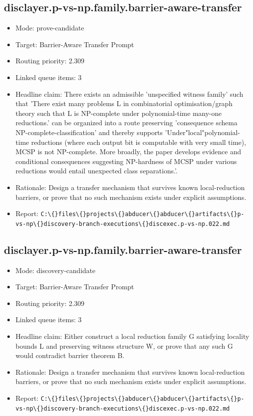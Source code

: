 \documentclass[11pt]{article}
\begin{document}
\subsection*{disclayer.p-vs-np.family.barrier-aware-transfer}
\begin{itemize}
\item Mode: prove-candidate
\item Target: Barrier-Aware Transfer Prompt
\item Routing priority: 2.309
\item Linked queue items: 3
\item Headline claim: There exists an admissible 'unspecified witness family' such that 'There exist many problems L in combinatorial optimisation/graph theory such that L is NP-complete under polynomial-time many-one reductions.' can be organized into a route preserving 'consequence schema NP-complete-classification' and thereby supports 'Under"local"polynomial-time reductions (where each output bit is computable with very small time), MCSP is not NP-complete. More broadly, the paper develops evidence and conditional consequences suggesting NP-hardness of MCSP under various reductions would entail unexpected class separations.'.
\item Rationale: Design a transfer mechanism that survives known local-reduction barriers, or prove that no such mechanism exists under explicit assumptions.
\item Report: \texttt{C:\textbackslash\{\}files\textbackslash\{\}projects\textbackslash\{\}abducer\textbackslash\{\}abducer\textbackslash\{\}artifacts\textbackslash\{\}p-vs-np\textbackslash\{\}discovery-branch-executions\textbackslash\{\}discexec.p-vs-np.022.md}
\end{itemize}

\subsection*{disclayer.p-vs-np.family.barrier-aware-transfer}
\begin{itemize}
\item Mode: discovery-candidate
\item Target: Barrier-Aware Transfer Prompt
\item Routing priority: 2.309
\item Linked queue items: 3
\item Headline claim: Either construct a local reduction family G satisfying locality bounds L and preserving witness structure W, or prove that any such G would contradict barrier theorem B.
\item Rationale: Design a transfer mechanism that survives known local-reduction barriers, or prove that no such mechanism exists under explicit assumptions.
\item Report: \texttt{C:\textbackslash\{\}files\textbackslash\{\}projects\textbackslash\{\}abducer\textbackslash\{\}abducer\textbackslash\{\}artifacts\textbackslash\{\}p-vs-np\textbackslash\{\}discovery-branch-executions\textbackslash\{\}discexec.p-vs-np.022.md}
\end{itemize}
\end{document}
